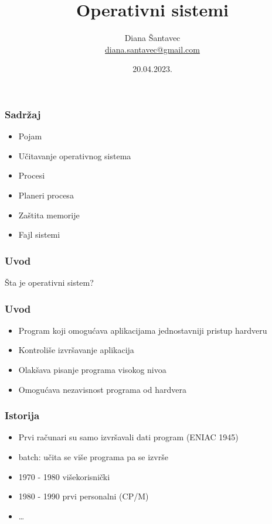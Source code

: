\documentclass{beamer}
\title{Operativni sistemi}
\author[Diana Šantavec]{Diana Šantavec \\ \small \url{diana.santavec@gmail.com}}
\institute{Istraživačka stanica Petnica}
\date{20.04.2023.}
\begin{document}
\frame{\titlepage}


\begin{frame}
\frametitle{Sadržaj}
\begin{itemize}
    \item Pojam \newline
    \item Učitavanje operativnog sistema \newline
    \item Procesi \newline
    \item Planeri procesa \newline
    \item Zaštita memorije \newline
    \item Fajl sistemi
\end{itemize}
\end{frame}

\begin{frame}
    \frametitle{Uvod}
    \begin{center}
        \large{Šta je operativni sistem?}
    \end{center}
\end{frame}


\begin{frame}
    \frametitle{Uvod}
    \begin{itemize}
        \item Program koji omogućava aplikacijama jednostavniji pristup hardveru \newline
        \item Kontroliše izvršavanje aplikacija \newline
        \item Olakšava pisanje programa visokog nivoa \newline
        \item Omogućava nezavisnost programa od hardvera \newline
    \end{itemize}
\end{frame}

\begin{frame}
    \frametitle{Istorija}
    \begin{itemize}
        \item Prvi računari su samo izvršavali dati program (ENIAC 1945) \newline
        \item batch: učita se više programa pa se izvrše \newline
        \item 1970 - 1980 višekorisnički \newline
        \item 1980 - 1990 prvi personalni (CP/M) \newline
        \item \dots
    \end{itemize}
\end{frame}
\end{document}
